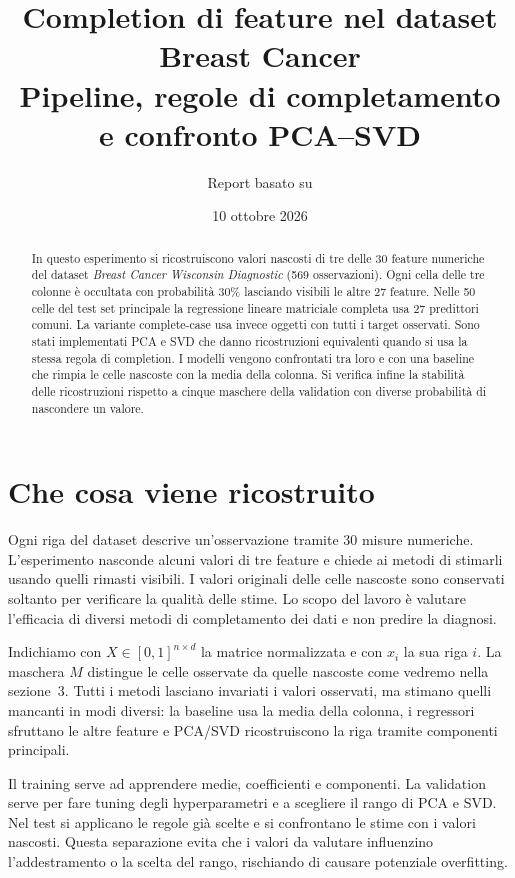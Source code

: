\documentclass[10pt,a4paper]{article}
\title{\vspace{-1.2cm}\textbf{Completion di feature nel dataset Breast Cancer}\\[4pt]
\large Pipeline, regole di completamento e confronto PCA--SVD}
\author{Report basato su \feat{completion\_breast\_cancer\_matrix.ipynb}}
\date{10 ottobre 2026}
\begin{document}
\maketitle
\vspace{-1.1cm}
\begin{abstract}
In questo esperimento si ricostruiscono valori nascosti di tre delle 30 feature numeriche del
dataset \emph{Breast Cancer Wisconsin Diagnostic} (569 osservazioni). Ogni cella
delle tre colonne è occultata con probabilità 30\% lasciando visibili le altre 27 feature. 
Nelle 50 celle del test set principale la regressione lineare
matriciale completa usa 27 predittori comuni. 
La variante complete-case usa invece oggetti con tutti i target osservati. 
Sono stati implementati PCA e SVD che danno ricostruzioni equivalenti quando si usa la stessa regola di completion.
I modelli vengono confrontati tra loro e con una baseline che rimpia le celle nascoste con la media della colonna.
Si verifica infine la stabilità delle ricostruzioni rispetto a cinque maschere della validation con diverse 
probabilità di nascondere un valore.
\end{abstract}

\section{Che cosa viene ricostruito}
Ogni riga del dataset descrive un'osservazione tramite 30 misure numeriche. 
L'esperimento nasconde alcuni valori di tre feature e chiede ai metodi di stimarli usando quelli rimasti visibili. 
I valori originali delle celle nascoste sono conservati soltanto per verificare la qualità delle stime. 
Lo scopo del lavoro è valutare l'efficacia di diversi metodi di completamento dei dati e non predire la diagnosi.

Indichiamo con $X\in[0,1]^{n\times d}$ la matrice normalizzata e con $x_i$ la sua riga $i$. 
La maschera $M$ distingue le celle osservate da quelle nascoste come vedremo nella sezione~3. 
Tutti i metodi lasciano invariati i valori osservati, ma stimano quelli mancanti in modi diversi: 
la baseline usa la media della colonna, i regressori sfruttano le altre feature e PCA/SVD ricostruiscono 
la riga tramite componenti principali.

Il training serve ad apprendere medie, coefficienti e componenti. 
La validation serve per fare tuning degli hyperparametri e a scegliere il rango di PCA e SVD. 
Nel test si applicano le regole già scelte e si confrontano le stime con i valori nascosti. 
Questa separazione evita che i valori da valutare influenzino l'addestramento o la scelta del rango, 
rischiando di causare potenziale overfitting.
\end{document}
